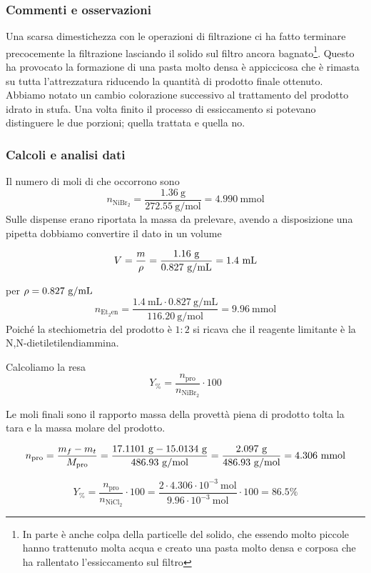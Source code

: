 \subsubsection{Commenti e osservazioni}
Una scarsa dimestichezza con le operazioni di filtrazione ci ha fatto terminare precocemente la filtrazione lasciando il solido sul filtro ancora bagnato\footnote{In parte è anche colpa della particelle del solido, che essendo molto piccole hanno trattenuto molta acqua e creato una pasta molto densa e corposa che ha rallentato l'essiccamento sul filtro}.
Questo ha provocato la formazione di una pasta molto densa è appiccicosa che è rimasta su tutta l'attrezzatura riducendo la quantità di prodotto finale ottenuto.
Abbiamo notato un cambio colorazione successivo al trattamento del prodotto idrato in stufa. Una volta finito il processo di essiccamento si potevano distinguere le due porzioni; quella trattata e quella no.
\subsubsection{Calcoli e analisi dati}

Il numero di moli di  che occorrono sono
$$
n_{\mathrm{NiBr}_2}=\frac{1.36 \mathrm{~g}}{272.55 \mathrm{~g} / \mathrm{mol}}=4.990 \mathrm{~mmol}
$$
Sulle dispense erano riportata la massa da prelevare, avendo a disposizione una pipetta dobbiamo convertire il dato in un volume

\[ V = \frac{m}{\rho} = \frac{1.16\mathrm{\ g}}{0.827 \mathrm{\ g/mL}} = 1.4 \mathrm{\ mL} \]


per  $\rho = 0.827 \mathrm{\ g/mL}$
$$
n_{\mathrm{Et}_2 \mathrm{en}}=\frac{1.4 \mathrm{~mL} \cdot 0.827 \mathrm{~g} / \mathrm{mL}}{116.20 \mathrm{~g} / \mathrm{mol}}=9.96 \mathrm{~mmol}
$$
Poiché la stechiometria del prodotto è $1: 2$ si ricava che il reagente limitante è la N,N-dietiletilendiammina. 

Calcoliamo la resa 
\[ Y_\% = \frac{n_\text{pro}}{n_{\mathrm{NiBr}_2}}\cdot 100 \]

Le moli finali sono il rapporto massa della provettà piena di prodotto tolta la tara e la massa molare del prodotto.

\[ n_\text{pro} = \frac{m_{f} - m_{t}}{M_\text{pro}} 
 = \frac{ 17.1101\mathrm{\ g} - 15.0134 \mathrm{\ g}}{ 486.93 \mathrm{\ g/mol}} =  \frac{2.097 \mathrm{~g}}{486.93 \mathrm{~g} / \mathrm{mol}}=4.306 \mathrm{\ mmol}\]

\[ Y_\% = \frac{n_\text{pro}}{n_{\mathrm{NiCl}_2}}\cdot 100  = \frac{2 \cdot 4.306 \cdot 10^{-3} \mathrm{~mol}}{9.96 \cdot 10^{-3} \mathrm{~mol}} \cdot 100 =86.5 \%\]


